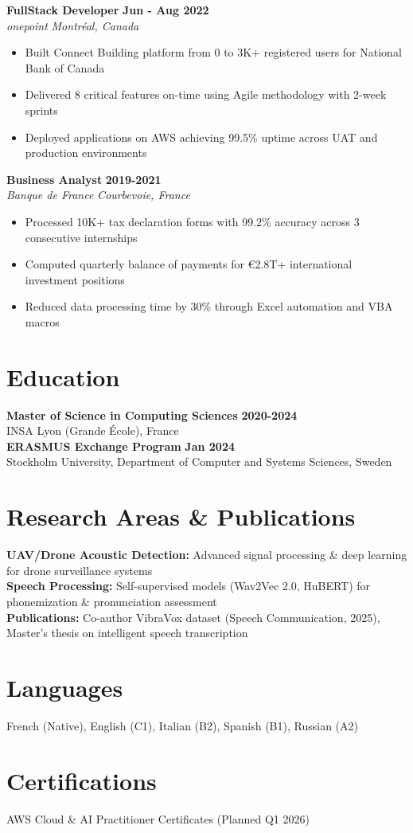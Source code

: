 \documentclass[10pt,letterpaper]{article}
\newcommand{\resumeItem}[1]{\item\footnotesize{#1}}
\newenvironment{resumeExperience}[4]{
    \vspace{1pt}
    \textbf{\small #1} \hfill \textbf{\small #2} \\
    \textit{\small #3} \hfill \textit{\small #4}
    \vspace{0pt}
    \begin{itemize}[leftmargin=*,noitemsep,topsep=0pt,itemsep=0pt]
}{
    \end{itemize}
    \vspace{2pt}
}
\begin{document}
\begin{resumeExperience}{FullStack Developer}{Jun - Aug 2022}{onepoint}{Montréal, Canada}
    \resumeItem{Built Connect Building platform from 0 to 3K+ registered users for National Bank of Canada}
    \resumeItem{Delivered 8 critical features on-time using Agile methodology with 2-week sprints}
    \resumeItem{Deployed applications on AWS achieving 99.5\% uptime across UAT and production environments}
\end{resumeExperience}

\begin{resumeExperience}{Business Analyst}{2019-2021}{Banque de France}{Courbevoie, France}
    \resumeItem{Processed 10K+ tax declaration forms with 99.2\% accuracy across 3 consecutive internships}
    \resumeItem{Computed quarterly balance of payments for €2.8T+ international investment positions}
    \resumeItem{Reduced data processing time by 30\% through Excel automation and VBA macros}
\end{resumeExperience}

\section{Education}
{\small \textbf{Master of Science in Computing Sciences} \hfill \textbf{2020-2024}} \\
{\small INSA Lyon (Grande École), France} \\
{\small \textbf{ERASMUS Exchange Program} \hfill \textbf{Jan 2024}} \\
{\small Stockholm University, Department of Computer and Systems Sciences, Sweden}

\section{Research Areas \& Publications}
{\small \textbf{UAV/Drone Acoustic Detection:} Advanced signal processing \& deep learning for drone surveillance systems} \\
{\small \textbf{Speech Processing:} Self-supervised models (Wav2Vec 2.0, HuBERT) for phonemization \& pronunciation assessment} \\
{\small \textbf{Publications:} Co-author VibraVox dataset (Speech Communication, 2025), Master's thesis on intelligent speech transcription}

\section{Languages}
{\small French (Native), English (C1), Italian (B2), Spanish (B1), Russian (A2)}

\section{Certifications}
{\small AWS Cloud \& AI Practitioner Certificates (Planned Q1 2026)}
\end{document}
